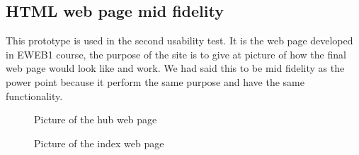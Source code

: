 \subsection{HTML web page mid fidelity}
This prototype is used in the second usability test. It is the web page developed in EWEB1 course, the purpose of the site is to give at picture of how the final web page would look like and work. We had said this to be mid fidelity as the power point because it perform the same purpose and have the same functionality.
\begin{figure}[h!]
	\center
		\setlength\fboxsep{0pt}
		\setlength\fboxrule{1pt}
   	\caption{Picture of the hub web page}
   	\label{fig:web_hub_interface}
\end{figure}
\begin{figure}[h!]
	\center
		\setlength\fboxsep{0pt}
		\setlength\fboxrule{1pt}
   	\caption{Picture of the index web page}
   	\label{fig:web_index_interface}
\end{figure}%

